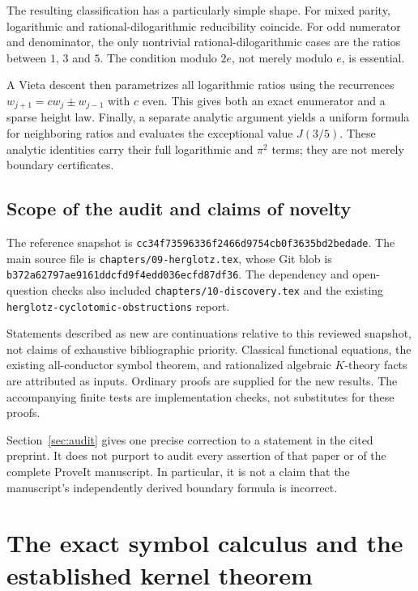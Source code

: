 \documentclass[11pt]{article}
\numberwithin{equation}{section}
\theoremstyle{definition}
\theoremstyle{remark}
\newcommand{\snapshot}{\texttt{cc34f73596336f2466d9754cb0f3635bd2bedade}}
\begin{document}
The resulting classification has a particularly simple shape. For
mixed parity, logarithmic and rational-dilogarithmic reducibility
coincide. For odd numerator and denominator, the only nontrivial
rational-dilogarithmic cases are the ratios between $1$, $3$ and $5$.
The condition modulo $2e$, not merely modulo $e$, is essential.

A Vieta descent then parametrizes all logarithmic ratios using the
recurrences $w_{j+1}=c w_j\pm w_{j-1}$ with $c$ even. This gives both
an exact enumerator and a sparse height law. Finally, a separate analytic
argument yields a uniform formula for neighboring ratios and evaluates
the exceptional value $J(3/5)$.
These analytic identities carry their full logarithmic and $\pi^2$
terms; they are not merely boundary certificates.

\subsection{Scope of the audit and claims of novelty}

The reference snapshot is \snapshot. The main source file is
\nolinkurl{chapters/09-herglotz.tex}, whose Git blob is
\texttt{b372a62797ae9161ddcfd9f4edd036ecfd87df36}. The dependency and
open-question checks also included
\nolinkurl{chapters/10-discovery.tex} and the existing
\nolinkurl{herglotz-cyclotomic-obstructions} report.

Statements described as new are continuations relative to this reviewed
snapshot, not claims of exhaustive bibliographic priority. Classical
functional equations, the existing all-conductor symbol theorem, and
rationalized algebraic $K$-theory facts are attributed as inputs. Ordinary
proofs are supplied for the new results. The accompanying finite tests
are implementation checks, not substitutes for these proofs.

Section~\ref{sec:audit} gives one precise correction to a statement in
the cited preprint. It does not purport to audit every assertion of that
paper or of the complete ProveIt manuscript. In particular, it is not a
claim that the manuscript's independently derived boundary formula is
incorrect.


\section{The exact symbol calculus and the established kernel theorem}
\label{sec:symbols}
\end{document}
